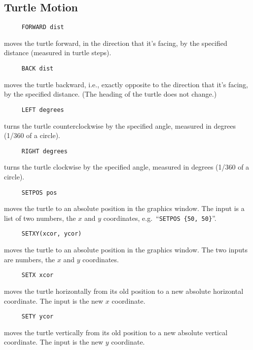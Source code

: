\subsection{Turtle Motion}

\begin{verbatim}
     FORWARD dist
\end{verbatim}
moves the turtle forward, in the direction that it's facing, by the
specified distance (measured in turtle steps).

\begin{verbatim}
     BACK dist
\end{verbatim}
moves the turtle backward, i.e., exactly opposite to the direction
that it's facing, by the specified distance.  (The heading of the
turtle does not change.)

\begin{verbatim}
     LEFT degrees
\end{verbatim}
turns the turtle counterclockwise by the specified angle, measured in
degrees (1/360 of a circle).

\begin{verbatim}
     RIGHT degrees
\end{verbatim}
turns the turtle clockwise by the specified angle, measured in degrees
(1/360 of a circle).

\begin{verbatim}
     SETPOS pos
\end{verbatim}
\label{logoturtle:setpos}
moves the turtle to an absolute position in the graphics window.  The
input is a list of two numbers, the $x$ and $y$ coordinates,
e.g.\ ``\texttt{SETPOS \{50, 50\}}''.

\begin{verbatim}
     SETXY(xcor, ycor)
\end{verbatim}
moves the turtle to an absolute position in the graphics window.  The
two inputs are numbers, the $x$ and $y$ coordinates.

\begin{verbatim}
     SETX xcor
\end{verbatim}
moves the turtle horizontally from its old position to a new absolute
horizontal coordinate.  The input is the new $x$ coordinate.

\begin{verbatim}
     SETY ycor
\end{verbatim}
moves the turtle vertically from its old position to a new absolute
vertical coordinate.  The input is the new $y$ coordinate.

